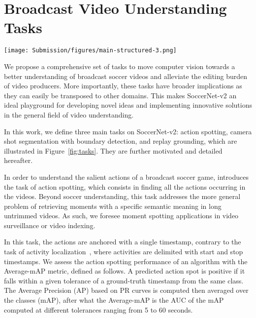 \documentclass[final]{cvsports}
\begin{document}
 \section{Broadcast Video Understanding Tasks}

\begin{figure*}
    \centering
    \texttt{[image: Submission/figures/main-structured-3.png]}
    \caption{\textbf{Tasks overview.}
    We define a 17-class \textcolor{newanthogreen}{\textbf{action spotting}} task, a 13-class \textcolor{newanthoblue}{\textbf{camera shot segmentation}} and \textcolor{newanthoblue}{\textbf{boundary detection}} tasks, and a novel \textcolor{newanthored}{\textbf{replay grounding}} task, with their associated performance metrics. They respectively focus on \textcolor{newanthogreen}{\textbf{understanding the content}} of broadcast soccer games, addressing broadcast \textcolor{newanthoblue}{\textbf{video editing tasks}}, and \textcolor{newanthored}{\textbf{retrieving salient moments}} of the game.} \label{fig:tasks}
\end{figure*}


We propose a comprehensive set of tasks to move computer vision towards a better understanding of broadcast soccer videos and alleviate the editing burden of video producers. More importantly, these tasks have broader implications as they can easily be transposed to other domains. This makes SoccerNet-v2 an ideal playground for developing novel ideas and implementing innovative solutions in the general field of video understanding.

In this work, we define three main tasks on SoccerNet-v2: action spotting, camera shot segmentation with boundary detection, and replay grounding, which are illustrated in Figure~\ref{fig:tasks}. They are further motivated and detailed hereafter. 



In order to understand the salient actions of a broadcast soccer game, \SoccerNet introduces the task of action spotting, which consists in finding all the actions occurring in the videos. Beyond soccer understanding, this task addresses the more general problem of retrieving moments with a specific semantic meaning in long untrimmed videos. As such, we foresee moment spotting applications in \eg video surveillance or video indexing.

In this task, the actions are anchored with a single timestamp, contrary to the task of activity localization~\cite{caba2015activitynet}, where activities are delimited with start and stop timestamps. 
We assess the action spotting performance of an algorithm with the Average-mAP metric, defined as follows. A predicted action spot is positive if it falls within a given tolerance  of a ground-truth timestamp from the same class. The Average Precision (AP) based on PR curves is computed then averaged over the classes (mAP), after what the Average-mAP is the AUC of the mAP computed at different tolerances  
ranging from 5 to 60 seconds. 
\end{document}

